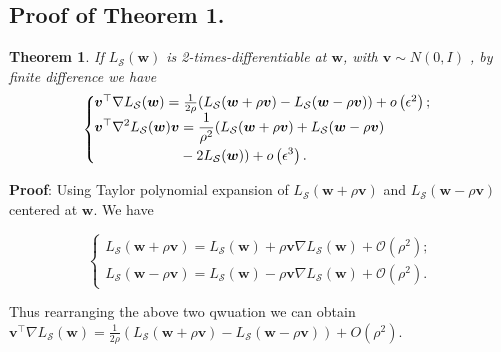 \documentclass[letterpaper]{article} %
\theoremstyle{plain}
\newtheorem{theorem}{Theorem}
\theoremstyle{definition}
\begin{document}
\subsection{Proof of Theorem 1.}
\begin{theorem} \label{theorem:fd}
If $L_{\mathcal{S}}(\boldsymbol{w})$ is 2-times-differentiable at $\boldsymbol{w}$, with $\boldsymbol{v} \sim N(0, I)$ , by finite difference we have
\begin{equation*}
\left\{\begin{array}{l}
\hspace{-0.2cm}\boldsymbol{v}^{\top} \nabla L_{\mathcal{S}}(\boldsymbol{w}) =\frac{1}{2\rho} (L_{\mathcal{S}}(\boldsymbol{w} + \rho\boldsymbol{v})- L_{\mathcal{S}}(\boldsymbol{w} - \rho\boldsymbol{v}))+o\left(\epsilon^2\right) ; \\

\begin{aligned}
\hspace{-0.2cm}\boldsymbol{v}^{\top} \nabla^2 L_{\mathcal{S}}(\boldsymbol{w}) \boldsymbol{v} &= \frac{1}{\rho^2} (L_{\mathcal{S}}(\boldsymbol{w}+\rho\boldsymbol{v})+L_{\mathcal{S}}(\boldsymbol{w}-\rho\boldsymbol{v}) \\
&-2 L_{\mathcal{S}}(\boldsymbol{w}))+o\left(\epsilon^3\right).
\end{aligned}
\end{array}\right.
\end{equation*}
\end{theorem}

\textbf{Proof}: Using Taylor polynomial expansion of $L_{\mathcal{S}}(\boldsymbol{w}+\rho\boldsymbol{v})$ and $L_{\mathcal{S}}(\boldsymbol{w}-\rho\boldsymbol{v})$ centered at $\boldsymbol{w}$. We have


\begin{equation}
\left\{\begin{array}{l}
L_{\mathcal{S}}(\boldsymbol{w}+\rho\boldsymbol{v})=L_{\mathcal{S}}(\boldsymbol{w}) + \rho\boldsymbol{v}\nabla L_{\mathcal{S}}(\boldsymbol{w})+\mathcal{O}\left(\rho^2\right) ; \\[10pt]
L_{\mathcal{S}}(\boldsymbol{w}-\rho\boldsymbol{v})=L_{\mathcal{S}}(\boldsymbol{w}) - \rho\boldsymbol{v}\nabla L_{\mathcal{S}}(\boldsymbol{w})+\mathcal{O}\left(\rho^2\right) .
\end{array}\right.
\end{equation}

Thus rearranging the above two qwuation we can obtain $\boldsymbol{v}^{\top} \nabla L_{\mathcal{S}}(\boldsymbol{w}) =\frac{1}{2\rho} (L_{\mathcal{S}}(\boldsymbol{w} + \rho\boldsymbol{v})- L_{\mathcal{S}}(\boldsymbol{w} - \rho\boldsymbol{v}))+O\left(\rho^2\right)$.
\end{document}
